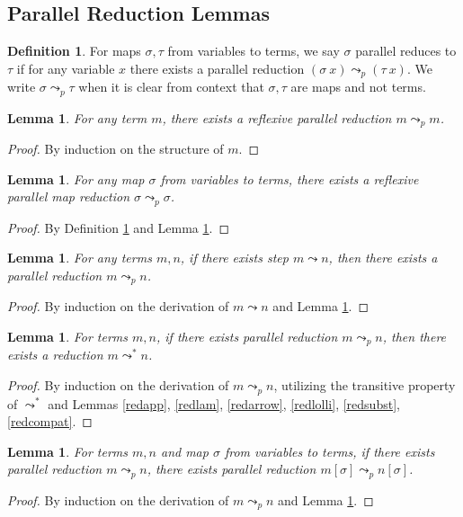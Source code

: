 \documentclass{article}
\newtheorem{lemma}[theorem]{Lemma}
\theoremstyle{definition}
\newtheorem{definition}{Definition}[section]
\newcommand{\step}{\leadsto}
\newcommand{\red}{\leadsto^*}
\newcommand{\pstep}{\leadsto_p}
\begin{document}
\subsection{Parallel Reduction Lemmas}

\begin{definition}\label{psstep}
  For maps $\sigma, \tau$ from variables to terms, we say $\sigma$ parallel reduces to $\tau$ if for any variable $x$ there exists a parallel reduction $(\sigma\ x) \pstep (\tau\ x)$. We write $\sigma \pstep \tau$ when it is clear from context that $\sigma, \tau$ are maps and not terms.
\end{definition}

\begin{lemma}\label{psteprefl}
  For any term $m$, there exists a reflexive parallel reduction $m \pstep m$.
\end{lemma}
\begin{proof}
  By induction on the structure of $m$.
\end{proof}

\begin{lemma}
  For any map $\sigma$ from variables to terms, there exists a reflexive parallel map reduction $\sigma \pstep \sigma$.
\end{lemma}
\begin{proof}
  By Definition \ref{psstep} and Lemma \ref{psteprefl}.
\end{proof}

\begin{lemma}\label{steppstep}
  For any terms $m, n$, if there exists step $m \step n$, then there exists a parallel reduction $m \pstep n$.
\end{lemma}
\begin{proof}
  By induction on the derivation of $m \step n$ and Lemma \ref{psteprefl}.
\end{proof}

\begin{lemma}\label{pstepred}
  For terms $m, n$, if there exists parallel reduction $m \pstep n$, then there exists a reduction $m \red n$.
\end{lemma}
\begin{proof}
  By induction on the derivation of $m \pstep n$, utilizing the transitive property of $\red$ and Lemmas \ref{redapp}, \ref{redlam}, \ref{redarrow}, \ref{redlolli}, \ref{redsubst}, \ref{redcompat}.
\end{proof}

\begin{lemma}
  For terms $m, n$ and map $\sigma$ from variables to terms, if there exists parallel reduction $m \pstep n$, there exists parallel reduction $m[\sigma] \pstep n[\sigma]$.
\end{lemma}
\begin{proof}
  By induction on the derivation of $m \pstep n$ and Lemma \ref{psteprefl}.
\end{proof}
\end{document}
